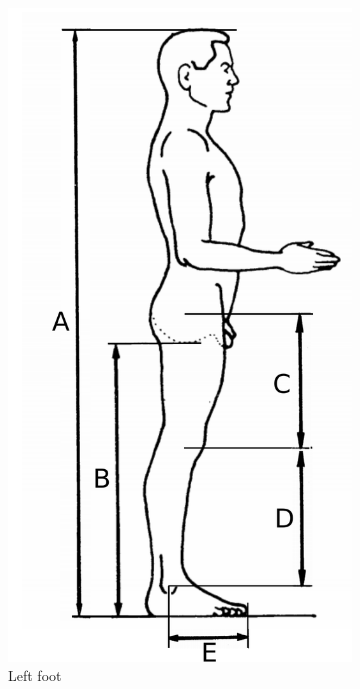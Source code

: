\begin{figure}[htb]
	\centering
	\begin{subfigure}[b]{0.3\textwidth}
        \includegraphics[width=\textwidth]{figures/din_measurements.pdf}
        \caption{Left foot}
        \label{fig:din1}
    \end{subfigure}
    \begin{subfigure}[b]{0.4\textwidth}

\end{subfigure}
\end{figure}
